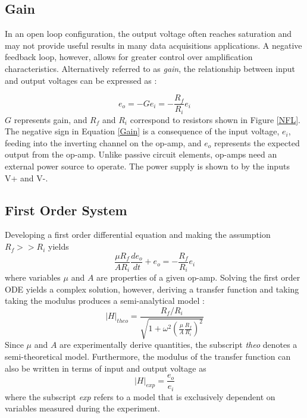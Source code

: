 \documentclass[letterpaper,12pt]{article}
\begin{document}
\subsection{Gain}
In an open loop configuration, the output voltage often reaches saturation and may not provide useful results in many data acquisitions applications. A negative feedback loop, however, allows for greater control over amplification characteristics. Alternatively referred to as \textit{gain}, the relationship between input and output voltages can be expressed as :

\begin{equation}
    \label{Gain}
    e_o = -Ge_i = -\frac{R_f}{R_i}e_i
\end{equation}
$G$ represents gain, and $R_f$ and $R_i$ correspond to resistors shown in Figure \ref{NFL}. The negative sign in Equation \ref{Gain} is a consequence of the input voltage, $e_i$, feeding into the inverting channel on the op-amp, and $e_o$ represents the expected output from the op-amp. Unlike passive circuit elements, op-amps need an external power source to operate. The power supply is shown to by the inputs V+ and V-.

\subsection{First Order System}
Developing a first order differential equation and making the assumption $R_f >> R_i$ yields 
\begin{equation}
    \label{1stOrder}
    \frac{\mu R_f}{A R_i}\frac{de_o}{dt} + e_o = -\frac{R_f}{R_i}e_i
\end{equation}
where variables $\mu$ and $A$ are properties of a given op-amp. Solving the first order ODE yields a complex solution, however, deriving a transfer function and taking taking the modulus produces a semi-analytical model : 
\begin{equation}
    \label{Htheo}
    |H|_{theo} = \frac{R_f/R_i}{\sqrt{1 + \omega^2(\frac{\mu}{A}\frac{R_f}{R_i})^2}}
\end{equation}
Since $\mu$ and $A$ are experimentally derive quantities, the subscript \textit{theo} denotes a semi-theoretical model. Furthermore, the modulus of the transfer function can also be written in terms of input and output voltage as
\begin{equation}
    \label{Hexp}
    |H|_{exp} = \frac{e_o}{e_i}
\end{equation}
where the subscript \textit{exp} refers to a model that is exclusively dependent on variables measured during the experiment.
\end{document}

